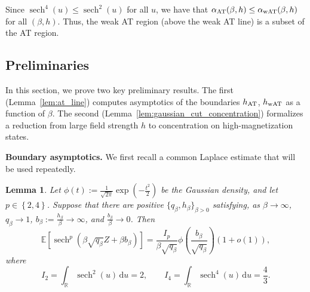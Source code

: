 \documentclass[11pt]{article}
\newtheorem{lemma}{Lemma}
\newcommand{\defeq}{:=}
\newcommand{\R}{\mathbb{R}}
\newcommand{\1}{\mathbf{1}}
\newcommand{\0}{\mathbf{0}}
\newcommand{\Par}[1]{\left(#1\right)}
\newcommand{\Brack}[1]{\left[#1\right]}
\newcommand{\Brace}[1]{\left\{#1\right\}}
\newcommand{\bbE}{{\mathbb{E}}}
\newcommand{\wAT}{_{\rm wAT}}
\newcommand{\AT}{_{\rm AT}}
\begin{document}
Since $\operatorname{sech}^4(u)\le\operatorname{sech}^2(u)$ for all $u$, we have that $\alpha_{\rm AT}(\beta,h)
    \le
    \alpha_{\rm wAT}(\beta,h)$ for all $(\beta, h)$. Thus, the weak AT region (above the weak AT line) is a subset of the AT region.

\subsection{Preliminaries}
\label{ssec:at_wat_scales}

In this section, we prove two key preliminary results. The first (Lemma~\ref{lem:at_line}) computes asymptotics of the boundaries $h\AT$, $h\wAT$ as a function of $\beta$. The second (Lemma~\ref{lem:gaussian_cut_concentration}) formalizes a reduction from large field strength $h$ to concentration on high-magnetization states.

\textbf{Boundary asymptotics.} We first recall a common Laplace estimate that will be used repeatedly. 

\begin{lemma}
    \label{lem:sech_laplace}
    Let \( \phi(t) \defeq \frac{1}{\sqrt{2\pi}} \exp(-\frac{t^2}{2})\) be the Gaussian density, and let $p\in\Brace{2,4}$. Suppose that there are positive $\{q_\beta, h_\beta\}_{\beta > 0}$ satisfying, as $\beta \to \infty$,
    $q_\beta\to1$, $b_\beta \defeq \frac{h_\beta} \beta \to\infty$, and
    $\frac{b_\beta} \beta\to0$. Then
    \begin{equation}
        \label{eq:sech_laplace}
        \bbE\Brack{
            \operatorname{sech}^p
            \Par{
                \beta\sqrt{q_\beta}Z+\beta b_\beta
            }
        }
        =
        \frac{
            I_p
        }{
            \beta\sqrt{q_\beta}
        }
        \phi\Par{
            \frac{
                b_\beta
            }{
                \sqrt{q_\beta}
            }
        }
        \Par{1+o(1)},
    \end{equation}
    where
    \[
        I_2
        =
        \int_{\R}\operatorname{sech}^2(u)\,\mathrm du
        =
        2,
        \qquad
        I_4
        =
        \int_{\R}\operatorname{sech}^4(u)\,\mathrm du
        =
        \frac{4}{3}.
    \]
\end{lemma}
\end{document}

